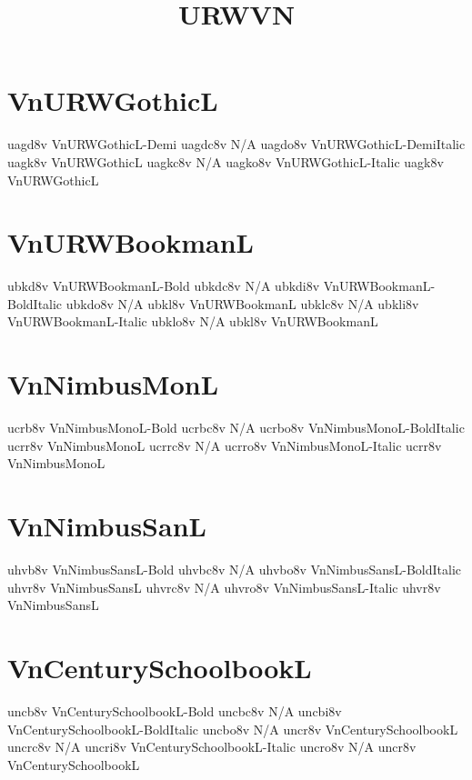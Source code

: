 \documentclass[sample]{vnsample}
\title{URWVN}
\begin{document}
\section{VnURWGothicL}
  {uagd8v}  {VnURWGothicL-Demi}
 {uagdc8v} {N/A}
 {uagdo8v} {VnURWGothicL-DemiItalic}
   {uagk8v}  {VnURWGothicL}
  {uagkc8v} {N/A}
  {uagko8v} {VnURWGothicL-Italic}
   {uagk8v}  {VnURWGothicL}

\section{VnURWBookmanL}
  {ubkd8v}  {VnURWBookmanL-Bold}
 {ubkdc8v} {N/A}
 {ubkdi8v} {VnURWBookmanL-BoldItalic}
 {ubkdo8v} {N/A}
   {ubkl8v}  {VnURWBookmanL}
  {ubklc8v} {N/A}
  {ubkli8v} {VnURWBookmanL-Italic}
  {ubklo8v} {N/A}
   {ubkl8v}  {VnURWBookmanL}

\section{VnNimbusMonL}
   {ucrb8v}  {VnNimbusMonoL-Bold}
  {ucrbc8v} {N/A}
  {ucrbo8v} {VnNimbusMonoL-BoldItalic}
   {ucrr8v}  {VnNimbusMonoL}
  {ucrrc8v} {N/A}
  {ucrro8v} {VnNimbusMonoL-Italic}
   {ucrr8v}  {VnNimbusMonoL}

\section{VnNimbusSanL}
   {uhvb8v}  {VnNimbusSansL-Bold}
  {uhvbc8v} {N/A}
  {uhvbo8v} {VnNimbusSansL-BoldItalic}
   {uhvr8v}  {VnNimbusSansL}
  {uhvrc8v} {N/A}
  {uhvro8v} {VnNimbusSansL-Italic}
   {uhvr8v}  {VnNimbusSansL}

\section{VnCenturySchoolbookL}
   {uncb8v}  {VnCenturySchoolbookL-Bold}
  {uncbc8v} {N/A}
  {uncbi8v} {VnCenturySchoolbookL-BoldItalic}
  {uncbo8v} {N/A}
   {uncr8v}  {VnCenturySchoolbookL}
  {uncrc8v} {N/A}
  {uncri8v} {VnCenturySchoolbookL-Italic}
  {uncro8v} {N/A}
   {uncr8v}  {VnCenturySchoolbookL}
\end{document}
